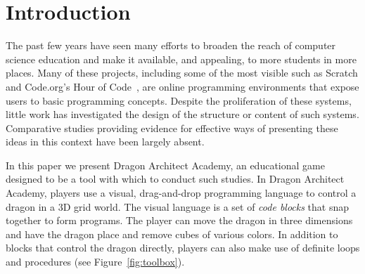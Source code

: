 \documentclass{sig-alternate}
\newcommand{\TODO}[1]{{\color{red} TODO: #1}}
\newcommand{\gametitle}{{\color{RoyalPurple} Dragon Architect Academy}}
\begin{document}
\section{Introduction}
The past few years have seen many efforts to broaden the reach of computer science education and make it available, and appealing, to more students in more places. 
Many of these projects, including some of the most visible such as Scratch and Code.org's Hour of Code~\cite{codedotorg}, are online programming environments that expose users to basic programming concepts. 
Despite the proliferation of these systems, little work has investigated the design of the structure or content of such systems. 
Comparative studies providing evidence for effective ways of presenting these ideas in this context have been largely absent. 


In this paper we present \gametitle{}, an educational game designed to be a tool with which to conduct such studies. 
In \gametitle{}, players use a visual, drag-and-drop programming language to control a dragon in a 3D grid world. 
The visual language is a set of \emph{code blocks} that snap together to form programs. 
The player can move the dragon in three dimensions and have the dragon place and remove cubes of various colors. 
In addition to blocks that control the dragon directly, players can also make use of definite loops and procedures (see Figure~\ref{fig:toolbox}).
\end{document}
